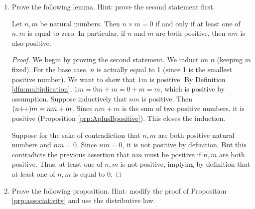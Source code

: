 \documentclass[../main.tex]{subfiles}
\begin{document}
\begin{enumerate}[ref={\thesection.\arabic*}]
\begin{lem}
\begin{proof}
\begin{lem}
\begin{proof}
                \end{proof}
            \end{lem}
            Now for the primary proof, we induct on $n$ (keeping $m$ fixed). For the base case $n=0$, Definition \ref{dfn:multiplication} gives us $0\times m=0$ while Lemma \ref{lem:ntimes0} gives us $m\times 0=0$. Thus, $0\times m=m\times 0$, proving the base case. Now suppose inductively that $n\times m=m\times n$. Then
            \begin{align*}
                (n\pplus)\times m &= (n\times m)+m\tag*{Definition \ref{dfn:multiplication}}\\
                &= (m\times n)+m\tag*{Induction hypothesis}\\
                &= m\times (n\pplus)\tag*{Lemma \ref{lem:ntimesmpplus}}
            \end{align*}
            This closes the induction.
        \end{proof}
    \end{lem}
    \item \label{exr:2.3.2}Prove the following lemma. Hint: prove the second statement first.
    \begin{lem}
        Let $n,m$ be natural numbers. Then $n\times m=0$ if and only if at least one of $n,m$ is equal to zero. In particular, if $n$ and $m$ are both positive, then $nm$ is also positive.
        \begin{proof}
            We begin by proving the second statement. We induct on $n$ (keeping $m$ fixed). For the base case, $n$ is actually equal to 1 (since 1 is the smallest positive number). We want to show that $1m$ is positive. By Definition \ref{dfn:multiplication}, $1m=0m+m=0+m=m$, which is positive by assumption. Suppose inductively that $nm$ is positive. Then $(n{+\!+})m=nm+m$. Since $nm+m$ is the sum of two positive numbers, it is positive (Proposition \ref{prp:AplusBpositive}). This closes the induction.\par
            Suppose for the sake of contradiction that $n,m$ are both positive natural numbers and $nm=0$. Since $nm=0$, it is not positive by definition. But this contradicts the previous assertion that $nm$ must be positive if $n,m$ are both positive. Thus, at least one of $n,m$ is not positive, implying by definition that at least one of $n,m$ is equal to 0.
        \end{proof}
    \end{lem}
    \item \label{exr:2.3.3}Prove the following proposition. Hint: modify the proof of Proposition \ref{prp:associativity} and use the distributive law.

\end{enumerate}
\end{document}
